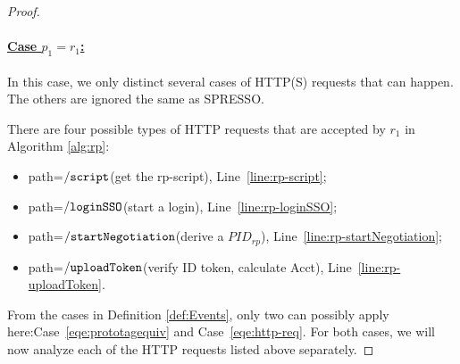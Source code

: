 \begin{theorem}
\begin{proof}
    \paragraph{\underline{Case $p_1=r_1$:}}
    In this case, we only distinct several cases of HTTP(S) requests that can happen. The others are ignored the same as SPRESSO.\par
    There are four possible types of HTTP requests that are accepted by $r_1$ in Algorithm \ref{alg:rp}:
    \begin{itemize}
      \item path=$\mathtt{/script}$(get the rp-script), Line~\ref{line:rp-script};
      \item path=$\mathtt{/loginSSO}$(start a login), Line~\ref{line:rp-loginSSO};
      \item path=$\mathtt{/startNegotiation}$(derive a $PID_{rp}$), Line~\ref{line:rp-startNegotiation};
      \item path=$\mathtt{/uploadToken}$(verify ID token, calculate Acct), Line~\ref{line:rp-uploadToken}.
    \end{itemize}
    \par From the cases in Definition \ref{def:Events}, only two 
    can possibly apply here:Case~\ref{eqe:prototagequiv} and 
    Case~\ref{eqe:http-req}. For both cases, we will now analyze 
    each of the HTTP requests listed above separately.
  

\end{proof}
\end{theorem}
